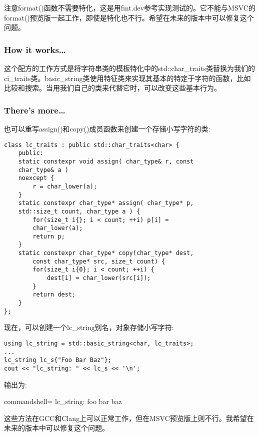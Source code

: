 \begin{tcolorbox}[colback=webgreen!5!white,colframe=webgreen!75!black,title=Note]
注意format()函数不需要特化，这是用fmt.dev参考实现测试的。它不能与MSVC的format()预览版一起工作，即使是特化也不行。希望在未来的版本中可以修复这个问题。
\end{tcolorbox}

\subsubsection{How it works…}

这个配方的工作方式是将字符串类的模板特化中的std::char\_traits类替换为我们的ci\_traits类。basic\_string类使用特征类来实现其基本的特定于字符的函数，比如比较和搜索。当用我们自己的类来代替它时，可以改变这些基本行为。

\subsubsection{There's more…}

也可以重写assign()和copy()成员函数来创建一个存储小写字符的类:

\begin{lstlisting}[style=styleCXX]
class lc_traits : public std::char_traits<char> {
	public:
	static constexpr void assign( char_type& r, const
	char_type& a )
	noexcept {
		r = char_lower(a);
	}
	static constexpr char_type* assign( char_type* p,
	std::size_t count, char_type a ) {
		for(size_t i{}; i < count; ++i) p[i] =
		char_lower(a);
		return p;
	}
	static constexpr char_type* copy(char_type* dest,
		const char_type* src, size_t count) {
		for(size_t i{0}; i < count; ++i) {
			dest[i] = char_lower(src[i]);
		}
		return dest;
	}
};
\end{lstlisting}

现在，可以创建一个lc\_string别名，对象存储小写字符:

\begin{lstlisting}[style=styleCXX]
using lc_string = std::basic_string<char, lc_traits>;
...
lc_string lc_s{"Foo Bar Baz"};
cout << "lc_string: " << lc_s << '\n';
\end{lstlisting}

输出为:

\begin{tcblisting}{commandshell={}}
lc_string: foo bar baz
\end{tcblisting}

\begin{tcolorbox}[colback=webgreen!5!white,colframe=webgreen!75!black,title=Note]
这些方法在GCC和Clang上可以正常工作，但在MSVC预览版上则不行。我希望在未来的版本中可以修复这个问题。
\end{tcolorbox}



















